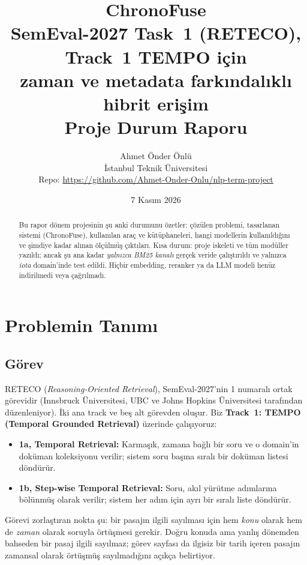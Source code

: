 \documentclass[11pt,a4paper]{article}
\title{\textbf{ChronoFuse}\\[2pt]\large SemEval-2027 Task~1 (RETECO), Track~1 TEMPO için\\
zaman ve metadata farkındalıklı hibrit erişim\\[6pt]
\normalsize Proje Durum Raporu}
\author{Ahmet Önder Önlü \\ İstanbul Teknik Üniversitesi \\
\small Repo: \url{https://github.com/Ahmet-Onder-Onlu/nlp-term-project}}
\date{7 Kasım 2026}
\begin{document}
\maketitle

\begin{abstract}
\noindent Bu rapor dönem projesinin şu anki durumunu özetler: çözülen problemi, tasarlanan
sistemi (ChronoFuse), kullanılan araç ve kütüphaneleri, hangi modellerin kullanıldığını ve
şimdiye kadar alınan ölçülmüş çıktıları. Kısa durum: proje iskeleti ve tüm modüller yazıldı;
ancak şu ana kadar \emph{yalnızca BM25 kanalı} gerçek veride çalıştırıldı ve yalnızca
\emph{iota} domain'inde test edildi. Hiçbir embedding, reranker ya da LLM modeli henüz
indirilmedi veya çağrılmadı.
\end{abstract}

\tableofcontents
\newpage

\section{Problemin Tanımı}

\subsection{Görev}
RETECO (\emph{Reasoning-Oriented Retrieval}), SemEval-2027'nin 1 numaralı ortak görevidir
(Innsbruck Üniversitesi, UBC ve Johns Hopkins Üniversitesi tarafından düzenleniyor). İki ana
track ve beş alt görevden oluşur. Biz \textbf{Track~1: TEMPO (Temporal Grounded Retrieval)}
üzerinde çalışıyoruz:

\begin{itemize}
  \item \textbf{1a, Temporal Retrieval:} Karmaşık, zamana bağlı bir soru ve o domain'in doküman
        koleksiyonu verilir; sistem soru başına sıralı bir doküman listesi döndürür.
  \item \textbf{1b, Step-wise Temporal Retrieval:} Soru, akıl yürütme adımlarına bölünmüş olarak
        verilir; sistem her adım için ayrı bir sıralı liste döndürür.
\end{itemize}

Görevi zorlaştıran nokta şu: bir pasajın ilgili sayılması için hem \emph{konu} olarak hem de
\emph{zaman} olarak soruyla örtüşmesi gerekir. Doğru konuda ama yanlış dönemden bahseden bir
pasaj ilgili sayılmaz; görev sayfası da ilgisiz bir tarih içeren pasajın zamansal olarak
örtüşmüş sayılmadığını açıkça belirtiyor.
\end{document}
